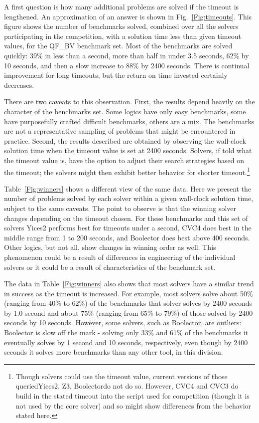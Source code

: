 \documentclass[twoside,11pt]{article}
\begin{document}
A first question is how many additional problems are solved if the timeout is lengthened. An approximation
of an answer is shown in Fig.~\ref{Fig:timeouts}. This figure shows the number of benchmarks solved, combined over all the solvers participating in the competition, with a solution time less than given timeout values, for the QF\_BV benchmark set.
Most of the benchmarks are solved quickly: 39\% in less than a second, more than half in under 3.5 seconds,
62\% by 10 seconds, and then a slow increase to 88\% by 2400 seconds. There is continual improvement for long timeouts, but the return on time invested certainly decreases.

There are two caveats to this observation. First, the results depend heavily on the character of the benchmarks set. Some logics have only easy benchmarks, some have purposefully crafted difficult benchmarks, others are a mix. The benchmarks are not a representative sampling of problems that might be encountered in practice.  Second, the results described are obtained by observing the wall-clock solution time when the timeout value is set at 2400 seconds. Solvers, if told what the timeout value is, have the option to adjust their search strategies based on the timeout; the solvers might then exhibit better behavior for shorter timeout.\footnote{Though solvers could use the timeout value, current versions of those queried\textemdash Yices2, Z3, Boolector\textemdash do not do so. However, CVC4 and CVC3 do build in the stated timeout into the script used for competition (though it is not used by the core solver) and so might show differences from the behavior stated here.}

Table~\ref{Fig:winners} shows a different view of the same data. Here we present the number of problems solved by each solver within a given wall-clock solution time, subject to the same caveats. The point to observe is that the winning solver changes depending on the timeout chosen. For these benchmarks and this set of solvers Yices2 performs best for timeouts under a second, CVC4 does best in the middle range from 1 to 200 seconds, and Boolector does best above 400 seconds. Other logics, but not all, show changes in winning order as well. This phenomenon could be a result of differences in engineering of the individual solvers or it could be a result of characteristics of the benchmark set.

The data in Table~\ref{Fig:winners} also shows that most solvers have a similar trend in success as the timeout is increased. For example, most solvers solve about 50\% (ranging from 40\% to 62\%) of the benchmarks that solver solves by 2400 seconds by 1.0 second and
about 75\% (ranging from 65\% to 79\%) of those solved by 2400 seconds by 10 seconds. However, some solvers, such as Boolector, are outliers: Boolector is slow off the mark - solving only 33\% and 61\% of the benchmarks it eventually solves
by 1 second and 10 seconds, respectively, even though by 2400 seconds it solves more benchmarks than any other tool, in this division.
\end{document}
